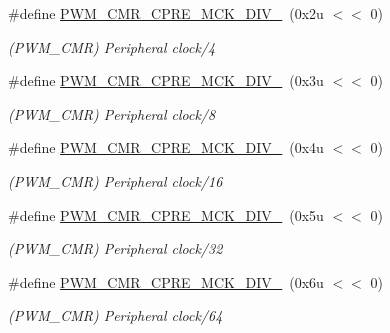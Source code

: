 \begin{DoxyCompactItemize}
\#define \mbox{\hyperlink{group__SAMS70__PWM_gaa64626b14684edb5448046b2ba3ddcdf}{P\+W\+M\+\_\+\+C\+M\+R\+\_\+\+C\+P\+R\+E\+\_\+\+M\+C\+K\+\_\+\+D\+I\+V\+\_}}~(0x2u $<$$<$ 0)
\begin{DoxyCompactList}\small\item\em (P\+W\+M\+\_\+\+C\+MR) Peripheral clock/4 \end{DoxyCompactList}\item 
\mbox{\label{group__SAMS70__PWM_gae7938e69e6d1c6f171c8f0cc14c18f61}} 
\#define \mbox{\hyperlink{group__SAMS70__PWM_gae7938e69e6d1c6f171c8f0cc14c18f61}{P\+W\+M\+\_\+\+C\+M\+R\+\_\+\+C\+P\+R\+E\+\_\+\+M\+C\+K\+\_\+\+D\+I\+V\+\_}}~(0x3u $<$$<$ 0)
\begin{DoxyCompactList}\small\item\em (P\+W\+M\+\_\+\+C\+MR) Peripheral clock/8 \end{DoxyCompactList}\item 
\mbox{\label{group__SAMS70__PWM_ga891db67f708bac4e03b331dbe2b9b736}} 
\#define \mbox{\hyperlink{group__SAMS70__PWM_ga891db67f708bac4e03b331dbe2b9b736}{P\+W\+M\+\_\+\+C\+M\+R\+\_\+\+C\+P\+R\+E\+\_\+\+M\+C\+K\+\_\+\+D\+I\+V\+\_}}~(0x4u $<$$<$ 0)
\begin{DoxyCompactList}\small\item\em (P\+W\+M\+\_\+\+C\+MR) Peripheral clock/16 \end{DoxyCompactList}\item 
\mbox{\label{group__SAMS70__PWM_gab46686466d77516d464299debf2704d1}} 
\#define \mbox{\hyperlink{group__SAMS70__PWM_gab46686466d77516d464299debf2704d1}{P\+W\+M\+\_\+\+C\+M\+R\+\_\+\+C\+P\+R\+E\+\_\+\+M\+C\+K\+\_\+\+D\+I\+V\+\_}}~(0x5u $<$$<$ 0)
\begin{DoxyCompactList}\small\item\em (P\+W\+M\+\_\+\+C\+MR) Peripheral clock/32 \end{DoxyCompactList}\item 
\mbox{\label{group__SAMS70__PWM_gabf069ffac1c8b10527ca0aa9172007f7}} 
\#define \mbox{\hyperlink{group__SAMS70__PWM_gabf069ffac1c8b10527ca0aa9172007f7}{P\+W\+M\+\_\+\+C\+M\+R\+\_\+\+C\+P\+R\+E\+\_\+\+M\+C\+K\+\_\+\+D\+I\+V\+\_}}~(0x6u $<$$<$ 0)
\begin{DoxyCompactList}\small\item\em (P\+W\+M\+\_\+\+C\+MR) Peripheral clock/64 \end{DoxyCompactList}\item 
$$
\end{DoxyCompactItemize}
